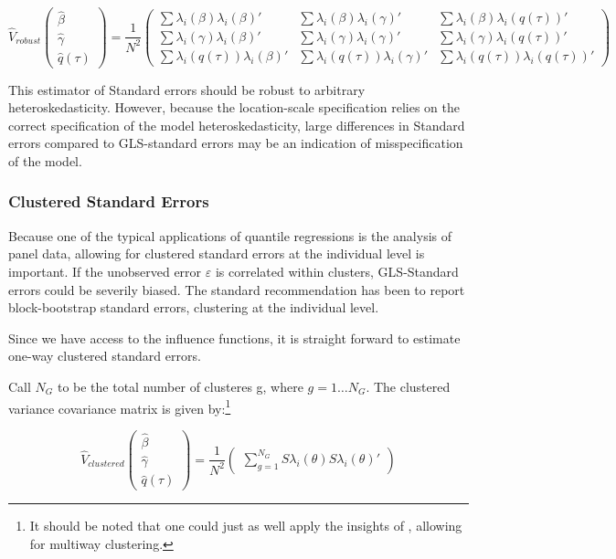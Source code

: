 \documentclass[
  authoryear,
  review,
  1p]{elsarticle}
\begin{document}
\[\hat{V}_{robust}
  \begin{pmatrix}
  \hat\beta \\
  \hat\gamma \\
  \hat q(\tau)
  \end{pmatrix}
 = \frac{1}{N^2} 
 \begin{pmatrix}
 \sum \lambda_i(\beta) \lambda_i(\beta)' & \sum \lambda_i(\beta) \lambda_i(\gamma)' & \sum \lambda_i(\beta) \lambda_i(q(\tau))' \\
 \sum \lambda_i(\gamma) \lambda_i(\beta)' & \sum \lambda_i(\gamma) \lambda_i(\gamma)' & \sum \lambda_i(\gamma) \lambda_i(q(\tau))' \\
 \sum \lambda_i(q(\tau)) \lambda_i(\beta)' & \sum \lambda_i(q(\tau))\lambda_i(\gamma)' & \sum \lambda_i(q(\tau)) \lambda_i(q(\tau))' 
  \end{pmatrix}
\]

This estimator of Standard errors should be robust to arbitrary
heteroskedasticity. However, because the location-scale specification
relies on the correct specification of the model heteroskedasticity,
large differences in Standard errors compared to GLS-standard errors may
be an indication of misspecification of the model.

\subsubsection{Clustered Standard
Errors}\label{clustered-standard-errors}

Because one of the typical applications of quantile regressions is the
analysis of panel data, allowing for clustered standard errors at the
individual level is important. If the unobserved error \(\varepsilon\)
is correlated within clusters, GLS-Standard errors could be severily
biased. The standard recommendation has been to report block-bootstrap
standard errors, clustering at the individual level.

Since we have access to the influence functions, it is straight forward
to estimate one-way clustered standard errors.

Call \(N_G\) to be the total number of clusteres g, where
\(g=1\dots N_G\). The clustered variance covariance matrix is given
by:\footnote{It should be noted that one could just as well apply the
  insights of \citet{cameron_robust_2011}, allowing for multiway
  clustering.}

\[\hat{V}_{clustered}
  \begin{pmatrix}
  \hat\beta \\
  \hat\gamma \\
  \hat q(\tau)
  \end{pmatrix}
 = \frac{1}{N^2} 
 \begin{pmatrix}
 \sum_{g=1}^{N_G} S\lambda_i(\theta) S\lambda_i(\theta)'
  \end{pmatrix}
\]
\end{document}

